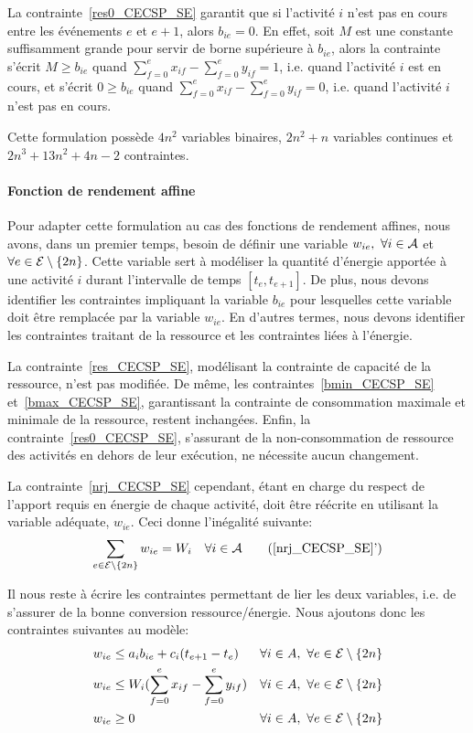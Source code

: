 La contrainte~\eqref{res0_CECSP_SE} garantit que si l'activité $i$
n'est pas en cours entre les événements $e$ et $e+1$, alors
$b_{ie}=0$. En effet, soit $M$ est une constante suffisamment grande
pour servir de borne supérieure à $b_{ie}$, alors la contrainte
s'écrit $M\ge b_{ie}$ quand $\sum_{f=0}^{e} x_{if}
-\sum_{f=0}^{e}y_{if}=1$, i.e. quand l'activité $i$ est en cours, et
s'écrit $0\ge b_{ie}$ quand $\sum_{f=0}^{e}
x_{if}-\sum_{f=0}^{e}y_{if}=0$, i.e. quand l'activité $i$ n'est pas en
cours.

Cette formulation possède $4n^2$ variables binaires, $2n^2+n$
variables continues et $2n^3+13n^2+4n-2$ contraintes.

\paragraph{Fonction de rendement affine}

Pour adapter cette formulation au cas des fonctions de rendement
affines, nous avons, dans un premier temps, besoin de définir une
variable $w_{ie},\ \forall i \in {\cal A}$ et $\forall e \in {\cal E}
\setminus\{2n\}$. Cette variable sert à modéliser la quantité
d'énergie apportée à une activité $i$ durant l'intervalle de temps
$[t_e,t_{e+1}]$. De plus, nous devons identifier les contraintes
impliquant la variable $b_{ie}$ pour lesquelles cette variable doit
être remplacée par la variable $w_{ie}$. En d'autres termes, nous
devons identifier les contraintes traitant de la ressource et les
contraintes liées à l'énergie.

La contrainte~\eqref{res_CECSP_SE}, modélisant la contrainte de
capacité de la ressource, n'est pas modifiée. De même, les
contraintes~\eqref{bmin_CECSP_SE} et~\eqref{bmax_CECSP_SE},
garantissant la contrainte de consommation maximale et minimale de la
ressource, restent inchangées. Enfin, la
contrainte~\eqref{res0_CECSP_SE}, s'assurant de la non-consommation de
ressource des activités en dehors de leur exécution, ne nécessite
aucun changement.

La contrainte~\eqref{nrj_CECSP_SE} cependant, étant en charge du
respect de l'apport requis en énergie de chaque activité, doit être
réécrite en utilisant la variable adéquate, $w_{ie}$. Ceci donne
l'inégalité suivante:
\begin{equation} 
\sum_{e\in \E\setminus\{2n\}} w_{ie} = W_i\quad \forall i \in \A
\tag{\ref{nrj_CECSP_SE}'}
\label{nrj2_CECSP_SE}
\end{equation} 

Il nous reste à écrire les contraintes permettant de lier les deux
variables, i.e.  de s'assurer de la bonne conversion
ressource/énergie. Nous ajoutons donc les contraintes suivantes au
modèle:
\begin{align}
  &w_{ie} \le a_ib_{ie}+c_i(t_{e+1}-t_e) & & \forall i \in A,\ \forall
  e \in {\cal E} \setminus\{2n\} \label{conv1_CECSP_SE}\\
     &w_{ie} \le W_i (\sum_{f=0}^{e} x_{if} -\sum_{f=0}^{e} y_{if}) &
    & \forall i \in A,\ \forall e \in {\cal
      E}\setminus\{2n\} \label{conv2_CECSP_SE}\\
& w_{ie} \ge 0 & & \forall i \in A,\ \forall e \in {\cal
      E}\setminus\{2n\}
\label{Bw_CECSP_SE}
\end{align}

